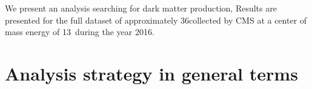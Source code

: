 

We present an analysis searching for dark matter production, Results are presented for the full dataset of approximately 36\fbinv collected by CMS at a center of mass energy of 13\TeV~during the year 2016. 

\newpage
\section{Analysis strategy in general terms}


